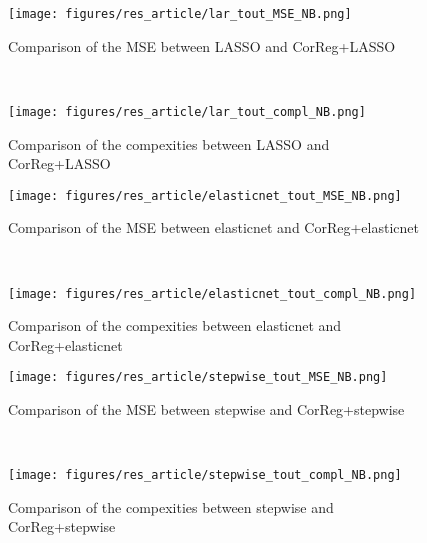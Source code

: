 \documentclass[11pt,a4paper]{report}
\begin{document}

 \begin{figure}[h!]
	\begin{minipage}[l]{.48\linewidth}
			\texttt{[image: figures/res\_article/lar\_tout\_MSE\_NB.png]} 
			\caption{Comparison of the MSE between LASSO and CorReg+LASSO}
	\end{minipage} \
   \begin{minipage}[r]{.48\linewidth}
			\texttt{[image: figures/res\_article/lar\_tout\_compl\_NB.png]} 
			\caption{Comparison of the compexities between LASSO and CorReg+LASSO} 
   \end{minipage}
\end{figure}

 \begin{figure}[h!]
	\begin{minipage}[l]{.48\linewidth}
			\texttt{[image: figures/res\_article/elasticnet\_tout\_MSE\_NB.png]} 
			\caption{Comparison of the MSE between elasticnet and CorReg+elasticnet}
	\end{minipage} \
   \begin{minipage}[r]{.48\linewidth}
			\texttt{[image: figures/res\_article/elasticnet\_tout\_compl\_NB.png]} 
			\caption{Comparison of the compexities between elasticnet and CorReg+elasticnet} 
   \end{minipage}
\end{figure}

 \begin{figure}[h!]
	\begin{minipage}[l]{.48\linewidth}
			\texttt{[image: figures/res\_article/stepwise\_tout\_MSE\_NB.png]} 
			\caption{Comparison of the MSE between stepwise and CorReg+stepwise}
	\end{minipage} \
   \begin{minipage}[r]{.48\linewidth}
			\texttt{[image: figures/res\_article/stepwise\_tout\_compl\_NB.png]} 
			\caption{Comparison of the compexities between stepwise and CorReg+stepwise} 
   \end{minipage}
\end{figure}
\end{document}
